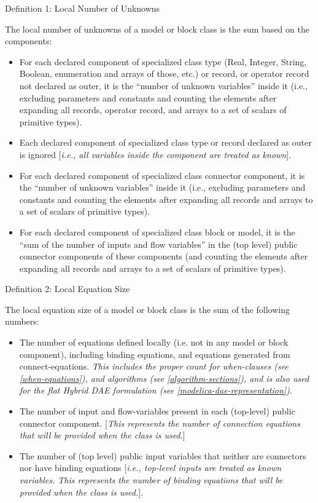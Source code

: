 \documentclass[10pt,a4paper]{report}
\begin{document}
Definition 1: Local Number of Unknowns

The local number of unknowns of a model or block class is the sum based
on the components:

\begin{itemize}
\item
  For each declared component of specialized class type (Real, Integer,
  String, Boolean, enumeration and arrays of those, etc.) or record, or
  operator record not declared as outer, it is the ``number of unknown
  variables'' inside it (i.e., excluding parameters and constants and
  counting the elements after expanding all records, operator record,
  and arrays to a set of scalars of primitive types).
\item
  Each declared component of specialized class type or record declared
  as outer is ignored {[}\emph{i.e., all variables inside the component
  are treated as known}{]}.
\item
  For each declared component of specialized class connector component,
  it is the ``number of unknown variables'' inside it (i.e., excluding
  parameters and constants and counting the elements after expanding all
  records and arrays to a set of scalars of primitive types).
\item
  For each declared component of specialized class block or model, it is
  the ``sum of the number of inputs and flow variables'' in the (top
  level) public connector components of these components (and counting
  the elements after expanding all records and arrays to a set of
  scalars of primitive types).
\end{itemize}

Definition 2: Local Equation Size

The local equation size of a model or block class is the sum of the
following numbers:

\begin{itemize}
\item
  The number of equations defined locally (i.e. not in any model or
  block component), including binding equations, and equations generated
  from connect-equations. \emph{This includes the proper count for
  when-clauses (see \ref{when-equations}), and algorithms (see \ref{algorithm-sections}), 
  and is also used for the flat Hybrid DAE formulation
  (see \ref{modelica-dae-representation})}.
\item
  The number of input and flow-variables present in each (top-level)
  public connector component. {[}\emph{This represents the number of
  connection equations that will be provided when the class is used.}{]}
\item
  The number of (top level) public input variables that neither are
  connectors nor have binding equations {[}\emph{i.e., top-level inputs
  are treated as known variables. This represents the number of binding
  equations that will be provided when the class is used.}{]}.
\end{itemize}
\end{document}
